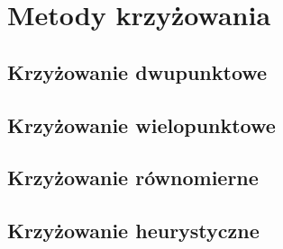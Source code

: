 \chapter{Metody krzyżowania}\label{cha:pierwszyDokument}


\section{Krzyżowanie dwupunktowe}\label{sec:strukturaDokumentu}


\section{Krzyżowanie wielopunktowe}\label{sec:kompilacja}


\section{Krzyżowanie równomierne}\label{sec:narzedzia}


\section{Krzyżowanie heurystyczne}\label{sec:narzedzia}
